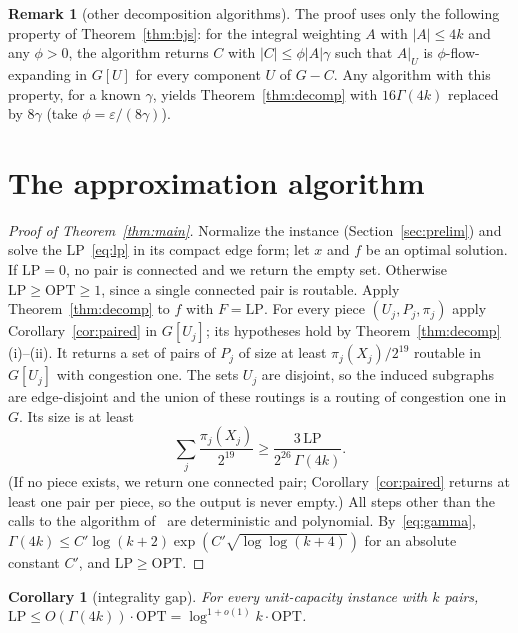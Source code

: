 \documentclass[11pt,letterpaper]{article}
\newtheorem{corollary}[theorem]{Corollary}
\theoremstyle{definition}
\newtheorem{remark}[theorem]{Remark}
\newcommand{\LP}{\mathrm{LP}}
\newcommand{\OPT}{\mathrm{OPT}}
\newcommand{\eps}{\varepsilon}
\begin{document}
\begin{remark}[other decomposition algorithms]\label{rem:oracle}
The proof uses only the following property of Theorem~\ref{thm:bjs}: for the integral
weighting $A$ with $|A|\le4k$ and any $\phi>0$, the algorithm returns $C$ with
$|C|\le\phi|A|\gamma$ such that $A|_U$ is $\phi$-flow-expanding in $G[U]$ for every component
$U$ of $G-C$. Any algorithm with this property, for a known $\gamma$, yields
Theorem~\ref{thm:decomp} with $16\Gamma(4k)$ replaced by $8\gamma$ (take $\phi=\eps/(8\gamma)$).
\end{remark}

\section{The approximation algorithm}\label{sec:main}

\begin{proof}[Proof of Theorem~\ref{thm:main}]
Normalize the instance (Section~\ref{sec:prelim}) and solve the LP~\eqref{eq:lp} in its
compact edge form; let $x$ and $f$ be an optimal solution. If $\LP=0$, no pair is connected and
we return the empty set. Otherwise $\LP\ge\OPT\ge1$, since a single connected pair is routable.
Apply Theorem~\ref{thm:decomp} to $f$ with $F=\LP$. For every piece $(U_j,P_j,\pi_j)$ apply
Corollary~\ref{cor:paired} in $G[U_j]$; its hypotheses hold by Theorem~\ref{thm:decomp}(i)--(ii).
It returns a set of pairs of $P_j$ of size at least $\pi_j(X_j)/2^{19}$ routable in $G[U_j]$
with congestion one. The sets $U_j$ are disjoint, so the induced subgraphs are edge-disjoint and
the union of these routings is a routing of congestion one in $G$. Its size is at least
\[
\sum_j\frac{\pi_j(X_j)}{2^{19}}\ge\frac{3\,\LP}{2^{26}\,\Gamma(4k)} .
\]
(If no piece exists, we return one connected pair; Corollary~\ref{cor:paired} returns at least
one pair per piece, so the output is never empty.) All steps other than the calls to the
algorithm of~\cite{BJS26} are deterministic and polynomial. By~\eqref{eq:gamma},
$\Gamma(4k)\le C'\log(k+2)\exp(C'\sqrt{\log\log(k+4)})$ for an absolute constant $C'$, and
$\LP\ge\OPT$.
\end{proof}

\begin{corollary}[integrality gap]
For every unit-capacity instance with $k$ pairs, $\LP\le O(\Gamma(4k))\cdot\OPT
=\log^{1+o(1)}k\cdot\OPT$.
\end{corollary}
\end{document}
